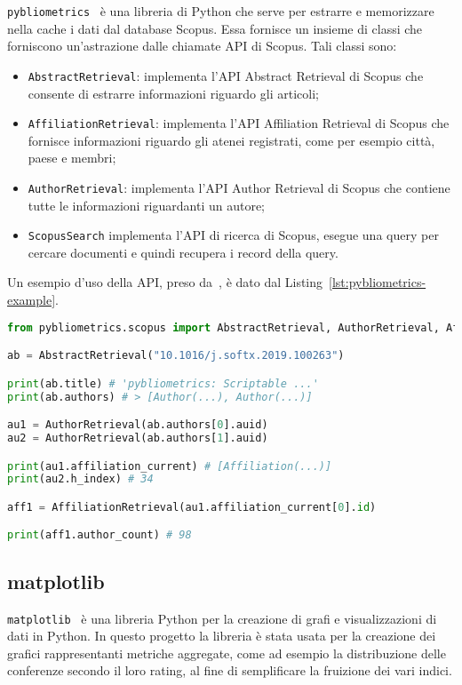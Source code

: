 \texttt{pybliometrics}~\cite{pybliometrics} è una libreria di Python che serve per estrarre e memorizzare nella cache i dati dal database Scopus.
Essa fornisce un insieme di classi che forniscono un'astrazione dalle chiamate
API di Scopus. Tali classi sono:
\begin{itemize}
	\item \texttt{AbstractRetrieval}: implementa l'API Abstract Retrieval di
	Scopus che consente di estrarre informazioni riguardo gli articoli;
	\item \texttt{AffiliationRetrieval}: implementa l'API Affiliation Retrieval
	di Scopus che fornisce informazioni riguardo gli atenei registrati, come per
	esempio città, paese e membri;
	\item \texttt{AuthorRetrieval}: implementa l'API Author Retrieval di Scopus
	che contiene tutte le informazioni riguardanti un autore;
	\item \texttt{ScopusSearch} implementa l'API di ricerca di Scopus, esegue una
	query per cercare documenti e quindi recupera i record della query.
\end {itemize}

Un esempio d'uso della API, preso da~\cite{pybliometrics}, è dato dal
Listing~\ref{lst:pybliometrics-example}.

\begin{lstlisting}[language=Python, caption=Esempio d'uso di \texttt{pybliometrics}, label=lst:pybliometrics-example]
from pybliometrics.scopus import AbstractRetrieval, AuthorRetrieval, AffiliationRetrieval

ab = AbstractRetrieval("10.1016/j.softx.2019.100263")

print(ab.title) # 'pybliometrics: Scriptable ...'
print(ab.authors) # > [Author(...), Author(...)]

au1 = AuthorRetrieval(ab.authors[0].auid)
au2 = AuthorRetrieval(ab.authors[1].auid)

print(au1.affiliation_current) # [Affiliation(...)]
print(au2.h_index) # 34

aff1 = AffiliationRetrieval(au1.affiliation_current[0].id)

print(aff1.author_count) # 98
\end{lstlisting}

\subsection{matplotlib}

\texttt{matplotlib}~\cite{matplotlib} è una libreria Python per la creazione
di grafi e visualizzazioni di dati in Python. In questo progetto la libreria
è stata usata per la creazione dei grafici rappresentanti metriche aggregate,
come ad esempio la distribuzione delle conferenze secondo il loro rating, 
al fine di semplificare la fruizione dei vari indici.

